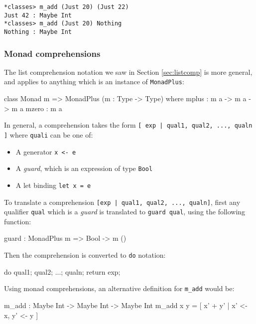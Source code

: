\begin{lstlisting}
*classes> m_add (Just 20) (Just 22) 
Just 42 : Maybe Int
*classes> m_add (Just 20) Nothing 
Nothing : Maybe Int
\end{lstlisting}

\subsubsection*{Monad comprehensions}

The list comprehension notation we saw in Section \ref{sec:listcomp} is more
general, and applies to anything which is an instance of \texttt{MonadPlus}:

\begin{code}
class Monad m => MonadPlus (m : Type -> Type) where
    mplus : m a -> m a -> m a
    mzero : m a
\end{code}

\noindent
In general, a comprehension takes the form \texttt{[ exp | qual1, qual2, ..., qualn ]} where
\texttt{quali} can be one of:

\begin{itemize}
\item A generator \texttt{x <- e}
\item A \emph{guard}, which is an expression of type \texttt{Bool}
\item A let binding \texttt{let x = e}
\end{itemize}

\noindent
To translate a comprehension \texttt{[exp | qual1, qual2, ..., qualn]}, first
any qualifier
\texttt{qual} which is a \emph{guard} is translated to \texttt{guard qual}, using
the following function:

\begin{code}
guard : MonadPlus m => Bool -> m ()
\end{code} 

\noindent
Then the comprehension is converted to \texttt{do} notation:

\begin{code}
do { qual1; qual2; ...; qualn; return exp; }
\end{code} 

\noindent
Using monad comprehensions, an alternative definition for \texttt{m\_add} would be:

\begin{code}
m_add : Maybe Int -> Maybe Int -> Maybe Int
m_add x y = [ x' + y' | x' <- x, y' <- y ]
\end{code} 

